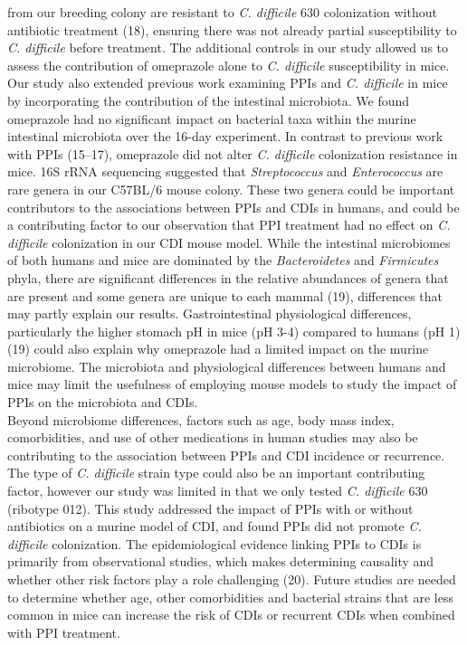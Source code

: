 \documentclass[11pt,]{article}
\begin{document}
from our breeding colony are resistant to \emph{C. difficile} 630
colonization without antibiotic treatment (18), ensuring there was not
already partial susceptibility to \emph{C. difficile} before treatment.
The additional controls in our study allowed us to assess the
contribution of omeprazole alone to \emph{C. difficile} susceptibility
in mice.\\
Our study also extended previous work examining PPIs and \emph{C.
difficile} in mice by incorporating the contribution of the intestinal
microbiota. We found omeprazole had no significant impact on bacterial
taxa within the murine intestinal microbiota over the 16-day experiment.
In contrast to previous work with PPIs (15--17), omeprazole did not
alter \emph{C. difficile} colonization resistance in mice. 16S rRNA
sequencing suggested that \emph{Streptococcus} and \emph{Enterococcus}
are rare genera in our C57BL/6 mouse colony. These two genera could be
important contributors to the associations between PPIs and CDIs in
humans, and could be a contributing factor to our observation that PPI
treatment had no effect on \emph{C. difficile} colonization in our CDI
mouse model. While the intestinal microbiomes of both humans and mice
are dominated by the \emph{Bacteroidetes} and \emph{Firmicutes} phyla,
there are significant differences in the relative abundances of genera
that are present and some genera are unique to each mammal (19),
differences that may partly explain our results. Gastrointestinal
physiological differences, particularly the higher stomach pH in mice
(pH 3-4) compared to humans (pH 1) (19) could also explain why
omeprazole had a limited impact on the murine microbiome. The microbiota
and physiological differences between humans and mice may limit the
usefulness of employing mouse models to study the impact of PPIs on the
microbiota and CDIs.\\
Beyond microbiome differences, factors such as age, body mass index,
comorbidities, and use of other medications in human studies may also be
contributing to the association between PPIs and CDI incidence or
recurrence. The type of \emph{C. difficile} strain type could also be an
important contributing factor, however our study was limited in that we
only tested \emph{C. difficile} 630 (ribotype 012). This study addressed
the impact of PPIs with or without antibiotics on a murine model of CDI,
and found PPIs did not promote \emph{C. difficile} colonization. The
epidemiological evidence linking PPIs to CDIs is primarily from
observational studies, which makes determining causality and whether
other risk factors play a role challenging (20). Future studies are
needed to determine whether age, other comorbidities and bacterial
strains that are less common in mice can increase the risk of CDIs or
recurrent CDIs when combined with PPI treatment.
\end{document}
